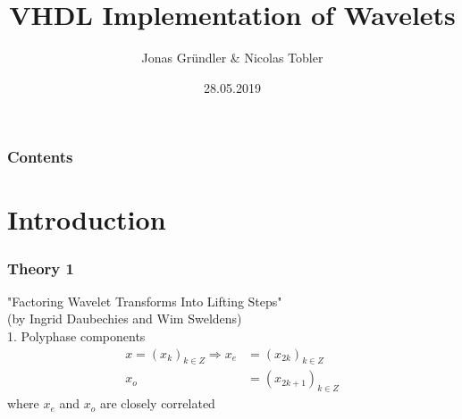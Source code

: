 \documentclass[english, aspectratio=169]{beamer}
\title{VHDL Implementation of Wavelets}
\author{Jonas Gründler \& Nicolas Tobler }
\institute{Mathematisches Seminar 2019}
\date{28.05.2019}
\begin{document}
\begin{frame}
\titlepage
\end{frame}

\begin{frame}
\frametitle{Contents}
\tableofcontents
\end{frame}

\section{Introduction}

\begin{frame}
	\frametitle{Theory 1}
	"Factoring Wavelet Transforms Into Lifting Steps"\\
	 (by Ingrid Daubechies and Wim Sweldens)\\
	1. Polyphase components
	\begin{equation}
	\begin{aligned}
		x = (x_k)_{k \in Z} \Rightarrow x_e &= (x_{2k})_{k \in Z} \\
		x_o &= (x_{2k+1})_{k \in Z}
		\end{aligned}
	\end{equation}
	where $x_e$ and $x_o$ are closely correlated
\end{frame}
\end{document}
